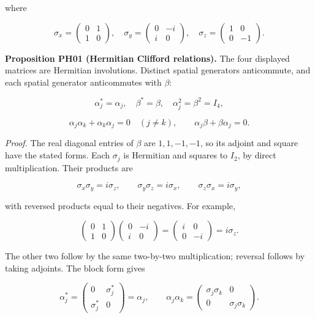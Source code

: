 where

\[
\sigma_x=\begin{pmatrix}0&1\\1&0\end{pmatrix},
\quad
\sigma_y=\begin{pmatrix}0&-i\\i&0\end{pmatrix},
\quad
\sigma_z=\begin{pmatrix}1&0\\0&-1\end{pmatrix}.
\]

\textbf{Proposition PH01 (Hermitian Clifford relations).} The four
displayed matrices are Hermitian involutions. Distinct spatial
generators anticommute, and each spatial generator anticommutes with
\(\beta\):

\[
\alpha_j^*=\alpha_j,\quad \beta^*=\beta,\quad
\alpha_j^2=\beta^2=I_4,
\]

\[
\alpha_j\alpha_k+\alpha_k\alpha_j=0\quad(j\ne k),
\qquad
\alpha_j\beta+\beta\alpha_j=0.
\]

\emph{Proof.} The real diagonal entries of \(\beta\) are
\(1,1,-1,-1\), so its adjoint and square have the stated forms. Each
\(\sigma_j\) is Hermitian and squares to \(I_2\), by direct
multiplication. Their products are

\[
\sigma_x\sigma_y=i\sigma_z,\qquad
\sigma_y\sigma_z=i\sigma_x,\qquad
\sigma_z\sigma_x=i\sigma_y,
\]

with reversed products equal to their negatives. For example,

\[
\begin{pmatrix}0&1\\1&0\end{pmatrix}
\begin{pmatrix}0&-i\\i&0\end{pmatrix}
=\begin{pmatrix}i&0\\0&-i\end{pmatrix}=i\sigma_z.
\]

The other two follow by the same two-by-two multiplication; reversal
follows by taking adjoints. The block form gives

\[
\alpha_j^*=
\begin{pmatrix}0&\sigma_j^*\\\sigma_j^*&0\end{pmatrix}
=\alpha_j,\qquad
\alpha_j\alpha_k=
\begin{pmatrix}\sigma_j\sigma_k&0\\0&\sigma_j\sigma_k\end{pmatrix}.
\]

